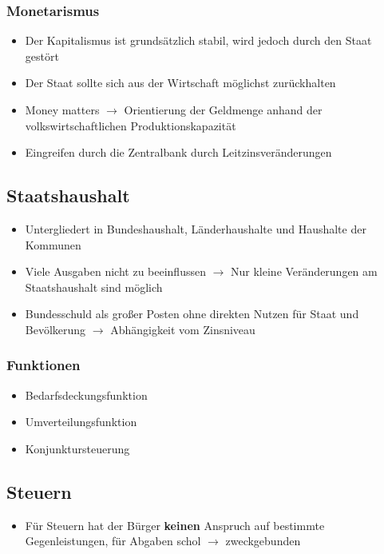 \documentclass[titlepage,parskip=half]{scrartcl}
\begin{document}
\subsubsection{Monetarismus}
\begin{itemize}
    \item Der Kapitalismus ist grundsätzlich stabil, wird jedoch durch den Staat gestört
    \item Der Staat sollte sich aus der Wirtschaft möglichst zurückhalten
    \item Money matters $\rightarrow$ Orientierung der Geldmenge anhand der volkswirtschaftlichen Produktionskapazität
    \item Eingreifen durch die Zentralbank durch Leitzinsveränderungen
\end{itemize}

\subsection{Staatshaushalt}
\begin{itemize}
    \item Untergliedert in Bundeshaushalt, Länderhaushalte und Haushalte der Kommunen
    \item Viele Ausgaben nicht zu beeinflussen $\rightarrow$ Nur kleine Veränderungen am Staatshaushalt sind möglich
    \item Bundesschuld als großer Posten ohne direkten Nutzen für Staat und Bevölkerung $\rightarrow$ Abhängigkeit vom Zinsniveau
\end{itemize}
\subsubsection{Funktionen}
\begin{itemize}
    \item Bedarfsdeckungsfunktion
    \item Umverteilungsfunktion
    \item Konjunktursteuerung
\end{itemize}

\subsection{Steuern}
\begin{itemize}
    \item Für Steuern hat der Bürger \textbf{keinen} Anspruch auf bestimmte Gegenleistungen, für Abgaben schol $\rightarrow$ zweckgebunden
\end{itemize}
\end{document}
